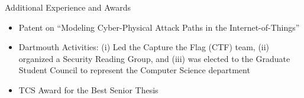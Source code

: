 \documentclass[]{mcdowellcv}
\begin{document}
	\begin{cvsection}{Additional Experience and Awards}
		\begin{cvsubsection}{}{}{}	
			\begin{itemize}
                \item {\color{dartmouthgreen} Patent} on ``Modeling Cyber-Physical Attack Paths in the Internet-of-Things''
                \item Dartmouth Activities: (i) Led the Capture the Flag (CTF) team, (ii) organized a Security Reading Group, and (iii) was elected to the Graduate Student Council to represent the Computer Science department
				\item TCS Award for the {\color{dartmouthgreen} Best Senior Thesis}
			\end{itemize}
		\end{cvsubsection}
	\end{cvsection}
\end{document}
